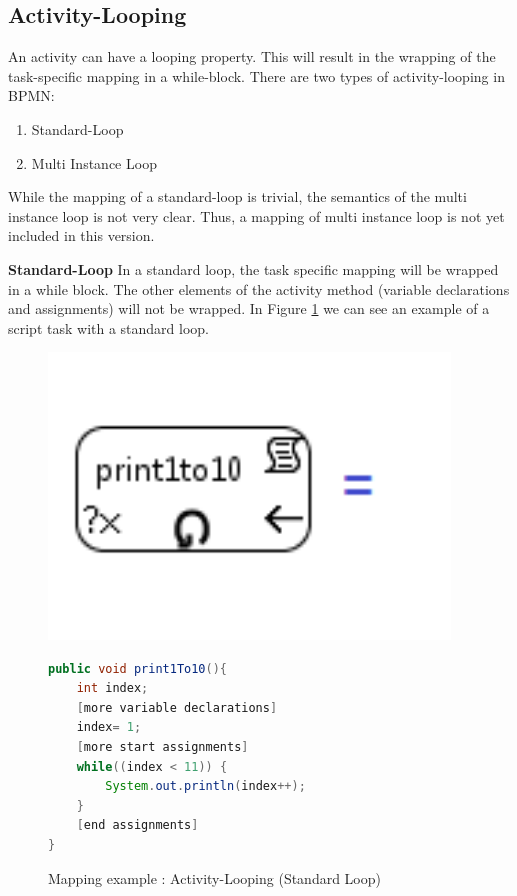\subsection{Activity-Looping}
An activity can have a looping property. This will result in the wrapping of the task-specific mapping in a while-block. 
There are two types of activity-looping in BPMN:
\begin{enumerate}
	\item Standard-Loop
	\item Multi Instance Loop
\end{enumerate}
While the mapping of a standard-loop is trivial, the semantics of the multi instance loop is not very clear. Thus, a mapping of multi instance loop is not yet included in this version.
 
\textbf{Standard-Loop}
In a standard loop, the task specific mapping will be wrapped in a while block. The other elements of the activity method (variable declarations and assignments) will not be wrapped.  In Figure \ref{fig:mapping_standardLoop} we can see an example of a script task with a standard loop.
\begin{figure}[h]
\begin{minipage}[c]{0.3\textwidth}
\includegraphics[width=0.95\textwidth]{images/mapping/standard_loop.png}
\end{minipage}
\begin{minipage}[c]{0.7\textwidth}
\begin{lstlisting}[language=Java]
public void print1To10(){
	int index;
	[more variable declarations]
	index= 1;
	[more start assignments]
	while((index < 11)) {
		System.out.println(index++);
	}
	[end assignments]
}
\end{lstlisting}
\end{minipage}
\caption{Mapping example : Activity-Looping (Standard Loop)}%
\label{fig:mapping_standardLoop}%
\end{figure}


